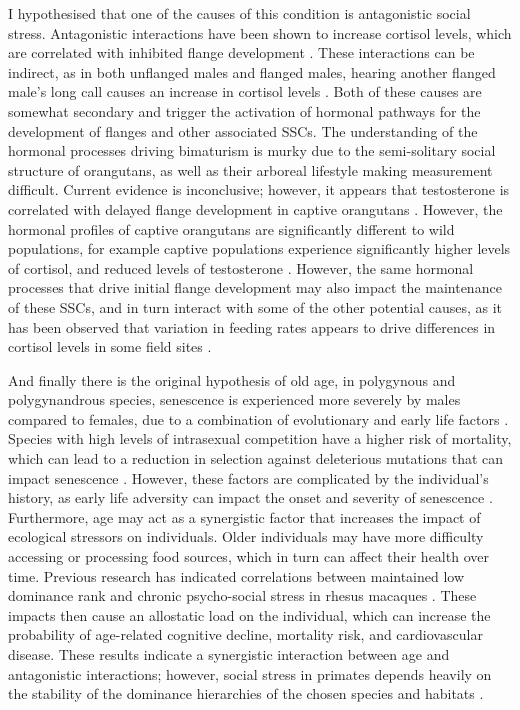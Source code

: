 I hypothesised that one of the causes of this condition is antagonistic social stress. Antagonistic interactions have been shown to increase cortisol levels, which are correlated with inhibited flange development \citep{Thompson.2012}. These interactions can be indirect, as in both unflanged males and flanged males, hearing another flanged male's long call causes an increase in cortisol levels \citep{Prasetyo.2021}. Both of these causes are somewhat secondary and trigger the activation of hormonal pathways for the development of flanges and other associated SSCs. The understanding of the hormonal processes driving bimaturism is murky due to the semi-solitary social structure of orangutans, as well as their arboreal lifestyle making measurement difficult. Current evidence is inconclusive; however, it appears that testosterone is correlated with delayed flange development in captive orangutans \citep{Thompson.2012, Muller.2017}. However, the hormonal profiles of captive orangutans are significantly different to wild populations, for example captive populations experience significantly higher levels of cortisol, and reduced levels of testosterone \citep{Prasetyo.2021}. However, the same hormonal processes that drive initial flange development may also impact the maintenance of these SSCs, and in turn interact with some of the other potential causes, as it has been observed that variation in feeding rates appears to drive differences in cortisol levels in some field sites \citep{Prasetyo.2021}.

And finally there is the original hypothesis of old age, in polygynous and polygynandrous species, senescence is experienced more severely by males compared to females, due to a combination of evolutionary and early life factors \citep{Graves.2007}. Species with high levels of intrasexual competition have a higher risk of mortality, which can lead to a reduction in selection against deleterious mutations that can impact senescence \citep{Williams.1957}. However, these factors are complicated by the individual's history, as early life adversity can impact the onset and severity of senescence \citep{Beirne.2015}. Furthermore, age may act as a synergistic factor that increases the impact of ecological stressors on individuals. Older individuals may have more difficulty accessing or processing food sources, which in turn can affect their health over time. Previous research has indicated correlations between maintained low dominance rank and chronic psycho-social stress in rhesus macaques \citep{Maestripieri.2011}. These impacts then cause an allostatic load on the individual, which can increase the probability of age-related cognitive decline, mortality risk, and cardiovascular disease. These results indicate a synergistic interaction between age and antagonistic interactions; however, social stress in primates depends heavily on the stability of the dominance hierarchies of the chosen species and habitats \citep{Czoty.2009, Mendonça-Furtado.2014, Muller.2004}. 


